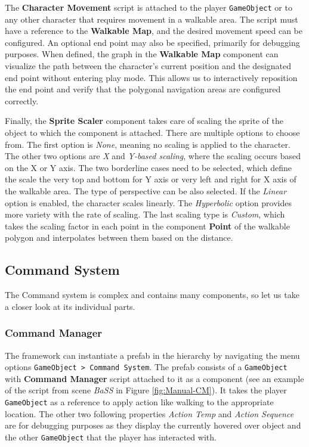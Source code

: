 The \textbf{Character Movement} script is attached to the player \verb|GameObject| or to any other character that requires movement in a walkable area. The script must have a reference to the \textbf{Walkable Map}, and the desired movement speed can be configured. An optional end point may also be specified, primarily for debugging purposes. When defined, the graph in the \textbf{Walkable Map} component can visualize the path between the character's current position and the designated end point without entering play mode. This allows us to interactively reposition the end point and verify that the polygonal navigation areas are configured correctly.

Finally, the \textbf{Sprite Scaler} component takes care of scaling the sprite of the object to which the component is attached. There are multiple options to choose from. The first option is \textit{None}, meaning no scaling is applied to the character. The other two options are \textit{X }and \textit{Y-based scaling}, where the scaling occurs based on the X or Y axis. The two borderline cases need to be selected, which define the scale the very top and bottom for Y axis or very left and right for X axis of the walkable area. The type of perspective can be also selected. If the \textit{Linear} option is enabled, the character scales linearly. The \textit{Hyperbolic} option provides more variety with the rate of scaling. The last scaling type is \textit{Custom}, which takes the scaling factor in each point in the component \textbf{Point} of the walkable polygon and interpolates between them based on the distance.

\subsection{Command System}
\label{Manual:CS}
The Command system is complex and contains many components, so let us take a closer look at its individual parts.

\subsubsection{Command Manager}
\label{Manual:CM}
The framework can instantiate a prefab in the hierarchy by navigating the menu options \verb|GameObject > Command System|. The prefab consists of a \verb|GameObject| with \textbf{Command Manager} script attached to it as a component (see an example of  the script from scene \textit{BaSS} in Figure \ref{fig:Manual-CM}). It takes the player \verb|GameObject| as a reference to apply action like walking to the appropriate location. The other two following properties \textit{Action Temp} and \textit{Action Sequence} are for debugging purposes as they display the currently hovered over object and the other \verb|GameObject| that the player has interacted with.

